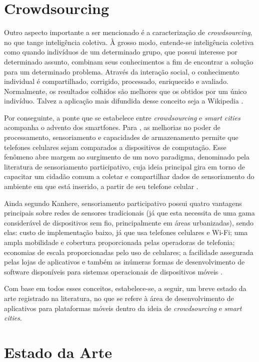 \section{Crowdsourcing}

Outro aspecto importante  a ser mencionado é a caracterização de \emph{crowdsourcing}, no que tange inteligência coletiva. À grosso modo, entende-se inteligência coletiva como quando indivíduos de um determinado grupo, que possui interesse por determinado assunto, combinam seus conhecimentos a fim de encontrar a solução para um determinado problema.  Através da interação social, o conhecimento individual é compartilhado, corrigido, processado, enriquecido e avaliado. Normalmente, os resultados colhidos são melhores que os obtidos por um único indivíduo. Talvez a aplicação mais difundida desse conceito seja a Wikipedia  \cite{schuurman}. 

Por conseguinte, a ponte que se estabelece entre \emph{crowdsourcing} e \emph{smart cities} acompanha o advento dos smartfones. Para , as melhorias no poder de processamento, sensoriamento e capacidades de armazenamento permite que telefones celulares sejam comparados a dispositivos de computação. Esse fenômeno abre margem ao surgimento de um novo paradigma, denominado pela literatura de sensoriamento participativo, cuja ideia principal gira em torno de capacitar um cidadão comum a coletar e compartilhar dados de sensoriamento do ambiente em que está inserido, a partir de seu telefone celular \cite{kanhere}.

Ainda segundo Kanhere, sensoriamento participativo possui quatro vantagens principais sobre redes de sensores tradicionais (já que esta necessita de uma gama considerável de dispositivos sem fio, principalmente em áreas urbanizadas), sendo elas: custo de implementação baixo, já que usa telefones celulares e Wi-Fi; uma ampla mobilidade e cobertura proporcionada pelas operadoras de telefonia; economias de escala proporcionadas pelo uso de celulares; a facilidade assegurada pelas lojas de aplicativos e também as inúmeras formas de desenvolvimento de software disponíveis para sistemas operacionais de dispositivos móveis \cite{kanhere}. 

Com base em todos esses conceitos, estabelece-se, a seguir, um breve estado da arte registrado na literatura, no que se refere à área de desenvolvimento de aplicativos para plataformas móveis dentro da ideia de \emph{crowdsourcing} e \emph{smart cities}.

\section{Estado da Arte}

